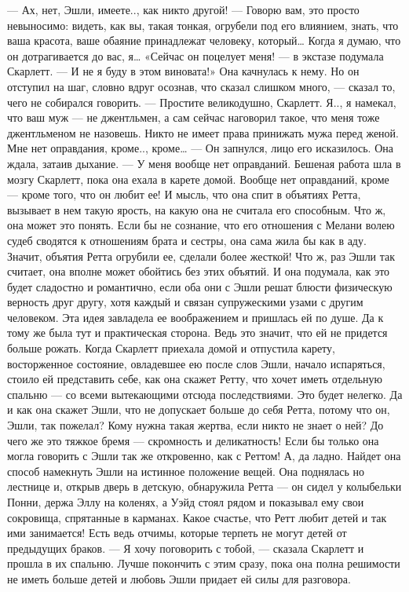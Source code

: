 — Ах, нет, Эшли, имеете.., как никто другой!
— Говорю вам, это просто невыносимо: видеть, как вы, такая тонкая, огрубели под его влиянием, знать, что ваша красота, ваше обаяние принадлежат человеку, который… Когда я думаю, что он дотрагивается до вас, я…
«Сейчас он поцелует меня! — в экстазе подумала Скарлетт. — И не я буду в этом виновата!» Она качнулась к нему. Но он отступил на шаг, словно вдруг осознав, что сказал слишком много, — сказал то, чего не собирался говорить.
— Простите великодушно, Скарлетт. Я.., я намекал, что ваш муж — не джентльмен, а сам сейчас наговорил такое, что меня тоже джентльменом не назовешь. Никто не имеет права принижать мужа перед женой. Мне нет оправдания, кроме.., кроме… — Он запнулся, лицо его исказилось. Она ждала, затаив дыхание. — У меня вообще нет оправданий.
Бешеная работа шла в мозгу Скарлетт, пока она ехала в карете домой. Вообще нет оправданий, кроме — кроме того, что он любит ее! И мысль, что она спит в объятиях Ретта, вызывает в нем такую ярость, на какую она не считала его способным. Что ж, она может это понять. Если бы не сознание, что его отношения с Мелани волею судеб сводятся к отношениям брата и сестры, она сама жила бы как в аду. Значит, объятия Ретта огрубили ее, сделали более жесткой! Что ж, раз Эшли так считает, она вполне может обойтись без этих объятий. И она подумала, как это будет сладостно и романтично, если оба они с Эшли решат блюсти физическую верность друг другу, хотя каждый и связан супружескими узами с другим человеком. Эта идея завладела ее воображением и пришлась ей по душе. Да к тому же была тут и практическая сторона. Ведь это значит, что ей не придется больше рожать.
Когда Скарлетт приехала домой и отпустила карету, восторженное состояние, овладевшее ею после слов Эшли, начало испаряться, стоило ей представить себе, как она скажет Ретту, что хочет иметь отдельную спальню — со всеми вытекающими отсюда последствиями. Это будет нелегко. Да и как она скажет Эшли, что не допускает больше до себя Ретта, потому что он, Эшли, так пожелал? Кому нужна такая жертва, если никто не знает о ней? До чего же это тяжкое бремя — скромность и деликатность! Если бы только она могла говорить с Эшли так же откровенно, как с Реттом! А, да ладно. Найдет она способ намекнуть Эшли на истинное положение вещей.
Она поднялась но лестнице и, открыв дверь в детскую, обнаружила Ретта — он сидел у колыбельки Понни, держа Эллу на коленях, а Уэйд стоял рядом и показывал ему свои сокровища, спрятанные в карманах. Какое счастье, что Ретт любит детей и так ими занимается! Есть ведь отчимы, которые терпеть не могут детей от предыдущих браков. — Я хочу поговорить с тобой, — сказала Скарлетт и прошла в их спальню. Лучше покончить с этим сразу, пока она полна решимости не иметь больше детей и любовь Эшли придает ей силы для разговора.
